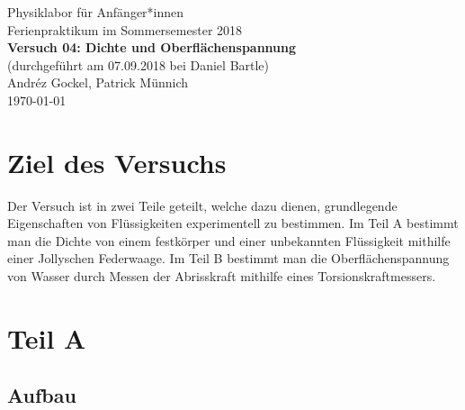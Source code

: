 \documentclass[11pt,a4paper]{article}
\begin{document}
{
\centering 
\large 
Physiklabor für Anf\"anger*innen \\
Ferienpraktikum im Sommersemester 2018 \\[4mm]
\textbf{\LARGE 
Versuch 04: Dichte und Oberflächenspannung
} \\[3mm]
(durchgef\"uhrt am 07.09.2018 bei Daniel Bartle) \\
Andréz Gockel, Patrick M\"unnich\\
\today \\[10mm]
}

\vspace{50pt}
\tableofcontents
\vspace{22pt}
\listoftables
\vspace{22pt}
\listoffigures
\pagebreak

\section{Ziel des Versuchs}
Der Versuch ist in zwei Teile geteilt, welche dazu dienen, grundlegende Eigenschaften von Fl\"ussigkeiten experimentell zu bestimmen. Im Teil A bestimmt man die Dichte von einem festkörper und einer unbekannten Fl\"ussigkeit mithilfe einer Jollyschen Federwaage. Im Teil B bestimmt man die Oberfl\"achen\-spannung von Wasser durch Messen der Abrisskraft mithilfe eines Torsionskraftmessers. 

\section{Teil A}
\subsection{Aufbau}
\end{document}
